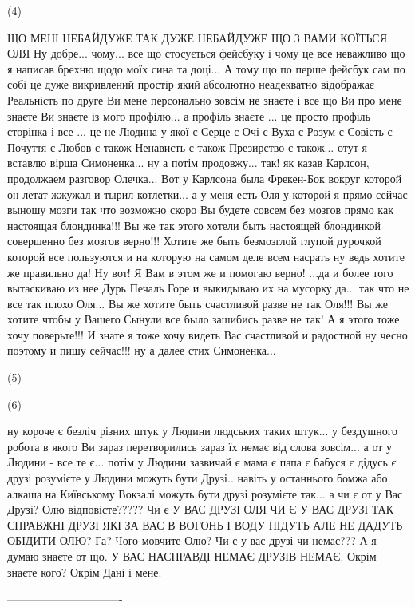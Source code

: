 (4)

ЩО МЕНІ НЕБАЙДУЖЕ ТАК ДУЖЕ НЕБАЙДУЖЕ ЩО З ВАМИ КОЇТЬСЯ ОЛЯ Ну добре... чому...
все що стосується фейсбуку і чому це все неважливо що я написав брехню щодо
моїх сина та доці... А тому що по перше фейсбук сам по собі це дуже викривлений
простір який абсолютно неадекватно відображає Реальність по друге Ви мене
персонально зовсім не знаєте і все що Ви про мене знаєте Ви знаєте із мого
профілю... а профіль знаєте ... це просто профіль сторінка і все ...  це не
Людина у якої є Серце є Очі є Вуха є Розум є Совість є Почуття є Любов є також
Ненависть є також Презирство є також... отут я вставлю вірша Симоненка... ну а
потім продовжу... так!  як казав Карлсон, продолжаем разговор Олечка... Вот у
Карлсона была Фрекен-Бок вокруг которой он летат жжужал и тырил котлетки... а у
меня есть Оля у которой я прямо сейчас выношу мозги так что возможно скоро Вы
будете совсем без мозгов прямо как настоящая блондинка!!! Вы же так этого
хотели быть настоящей блондинкой совершенно без мозгов верно!!! Хотите же быть
безмозглой глупой дурочкой которой все пользуются и на которую на самом деле
всем насрать ну ведь хотите же правильно да! Ну вот! Я Вам в этом же и помогаю
верно!  ...да и более того вытаскиваю из нее Дурь Печаль Горе и выкидываю их на
мусорку да... так что не все так плохо Оля... Вы же хотите быть счастливой
разве не так Оля!!! Вы же хотите чтобы у Вашего Сынули все было зашибись разве
не так! А я этого тоже хочу поверьте!!!  И знате я тоже хочу видеть Вас
счастливой и радостной ну чесно поэтому и пишу сейчас!!! ну а далее стих
Симоненка...

(5)



(6)

ну короче є безліч різних штук у Людини людських таких штук... у бездушного
робота в якого Ви зараз перетворились зараз їх немає від слова зовсім... а от у
Людини - все те є...  потім у Людини зазвичай є мама є папа є бабуся є дідусь є
друзі розумієте у Людини можуть бути Друзі.. навіть у останнього бомжа або
алкаша на Київському Вокзалі можуть бути друзі розумієте так... а чи є от у Вас
Друзі? Олю відповісте?????  Чи є У ВАС ДРУЗІ ОЛЯ ЧИ Є У ВАС ДРУЗІ ТАК СПРАВЖНІ
ДРУЗІ ЯКІ ЗА ВАС В ВОГОНЬ І ВОДУ ПІДУТЬ АЛЕ НЕ ДАДУТЬ ОБІДИТИ ОЛЮ? Га? Чого
мовчите Олю? Чи є у вас друзі чи немає??? А я думаю знаєте от що.  У ВАС
НАСПРАВДІ НЕМАЄ ДРУЗІВ НЕМАЄ. Окрім знаєте кого? Окрім Дані і мене.  

-------------------------------

